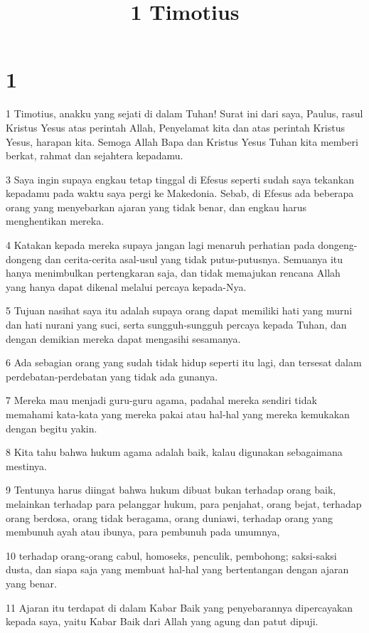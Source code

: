 

\title{1 Timotius}


\chapter{1}

\par 1 Timotius, anakku yang sejati di dalam Tuhan! Surat ini dari saya, Paulus, rasul Kristus Yesus atas perintah Allah, Penyelamat kita dan atas perintah Kristus Yesus, harapan kita. Semoga Allah Bapa dan Kristus Yesus Tuhan kita memberi berkat, rahmat dan sejahtera kepadamu.
\par 3 Saya ingin supaya engkau tetap tinggal di Efesus seperti sudah saya tekankan kepadamu pada waktu saya pergi ke Makedonia. Sebab, di Efesus ada beberapa orang yang menyebarkan ajaran yang tidak benar, dan engkau harus menghentikan mereka.
\par 4 Katakan kepada mereka supaya jangan lagi menaruh perhatian pada dongeng-dongeng dan cerita-cerita asal-usul yang tidak putus-putusnya. Semuanya itu hanya menimbulkan pertengkaran saja, dan tidak memajukan rencana Allah yang hanya dapat dikenal melalui percaya kepada-Nya.
\par 5 Tujuan nasihat saya itu adalah supaya orang dapat memiliki hati yang murni dan hati nurani yang suci, serta sungguh-sungguh percaya kepada Tuhan, dan dengan demikian mereka dapat mengasihi sesamanya.
\par 6 Ada sebagian orang yang sudah tidak hidup seperti itu lagi, dan tersesat dalam perdebatan-perdebatan yang tidak ada gunanya.
\par 7 Mereka mau menjadi guru-guru agama, padahal mereka sendiri tidak memahami kata-kata yang mereka pakai atau hal-hal yang mereka kemukakan dengan begitu yakin.
\par 8 Kita tahu bahwa hukum agama adalah baik, kalau digunakan sebagaimana mestinya.
\par 9 Tentunya harus diingat bahwa hukum dibuat bukan terhadap orang baik, melainkan terhadap para pelanggar hukum, para penjahat, orang bejat, terhadap orang berdosa, orang tidak beragama, orang duniawi, terhadap orang yang membunuh ayah atau ibunya, para pembunuh pada umumnya,
\par 10 terhadap orang-orang cabul, homoseks, penculik, pembohong; saksi-saksi dusta, dan siapa saja yang membuat hal-hal yang bertentangan dengan ajaran yang benar.
\par 11 Ajaran itu terdapat di dalam Kabar Baik yang penyebarannya dipercayakan kepada saya, yaitu Kabar Baik dari Allah yang agung dan patut dipuji.
